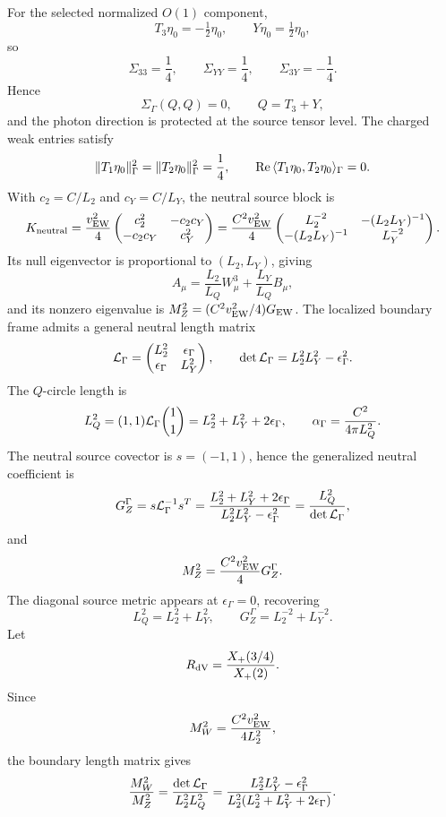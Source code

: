 \documentclass[11pt]{article}
\theoremstyle{definition}
\theoremstyle{remark}
\newcommand{\half}{\tfrac12}
\newcommand{\Xp}{X_+}
\begin{document}
For the selected normalized \(O(1)\) component,
\[
  T_3\eta_0=-\half\eta_0,\qquad
  Y\eta_0=\half\eta_0,
\]
so
\[
  \Sigma_{33}=\frac14,\qquad
  \Sigma_{YY}=\frac14,\qquad
  \Sigma_{3Y}=-\frac14.
\]
Hence
\[
  \Sigma_\Gamma(Q,Q)=0,\qquad Q=T_3+Y,
\]
and the photon direction is protected at the source tensor level.  The
charged weak entries satisfy
\[
  \|T_1\eta_0\|_\Gamma^2
  =
  \|T_2\eta_0\|_\Gamma^2
  =
  \frac14,
  \qquad
  {\rm Re}\,\langle T_1\eta_0,T_2\eta_0\rangle_\Gamma=0.
\]
With \(c_2=C/L_2\) and \(c_Y=C/L_Y\), the neutral source block is
\[
  K_{\rm neutral}
  =
  \frac{v_{\rm EW}^2}{4}
  \begin{pmatrix}
    c_2^2&-c_2c_Y\\
    -c_2c_Y&c_Y^2
  \end{pmatrix}
  =
  \frac{C^2v_{\rm EW}^2}{4}
  \begin{pmatrix}
    L_2^{-2}&-(L_2L_Y)^{-1}\\
    -(L_2L_Y)^{-1}&L_Y^{-2}
  \end{pmatrix}.
\]
Its null eigenvector is proportional to \((L_2,L_Y)\), giving
\[
  A_\mu=\frac{L_2}{L_Q}W^3_\mu+\frac{L_Y}{L_Q}B_\mu,
\]
and its nonzero eigenvalue is \(M_Z^2=(C^2v_{\rm EW}^2/4)G_{\rm EW}\).
The localized boundary frame admits a general neutral length matrix
\[
  {\cal L}_{\Gamma}
  =
  \begin{pmatrix}
    L_2^2&\epsilon_\Gamma\\
    \epsilon_\Gamma&L_Y^2
  \end{pmatrix},
  \qquad
  \det{\cal L}_{\Gamma}=L_2^2L_Y^2-\epsilon_\Gamma^2 .
\]
The \(Q\)-circle length is
\[
  L_Q^2
  =
  (1,1){\cal L}_{\Gamma}\binom{1}{1}
  =
  L_2^2+L_Y^2+2\epsilon_\Gamma,
  \qquad
  \alpha_\Gamma=\frac{C^2}{4\pi L_Q^2}.
\]
The neutral source covector is \(s=(-1,1)\), hence the generalized neutral
coefficient is
\[
  G_Z^\Gamma
  =
  s{\cal L}_{\Gamma}^{-1}s^T
  =
  \frac{L_2^2+L_Y^2+2\epsilon_\Gamma}
       {L_2^2L_Y^2-\epsilon_\Gamma^2}
  =
  \frac{L_Q^2}{\det{\cal L}_{\Gamma}},
\]
and
\[
  M_Z^2=\frac{C^2v_{\rm EW}^2}{4}G_Z^\Gamma .
\]
The diagonal source metric appears at \(\epsilon_\Gamma=0\), recovering
\[
  L_Q^2=L_2^2+L_Y^2,\qquad
  G_Z^\Gamma=L_2^{-2}+L_Y^{-2}.
\]
Let
\[
  R_{\rm dV}=\frac{\Xp(3/4)}{\Xp(2)}.
\]
Since
\[
  M_W^2=\frac{C^2v_{\rm EW}^2}{4L_2^2},
\]
the boundary length matrix gives
\[
  \frac{M_W^2}{M_Z^2}
  =
  \frac{\det{\cal L}_{\Gamma}}{L_2^2L_Q^2}
  =
  \frac{L_2^2L_Y^2-\epsilon_\Gamma^2}
       {L_2^2(L_2^2+L_Y^2+2\epsilon_\Gamma)}.
\]
\end{document}
